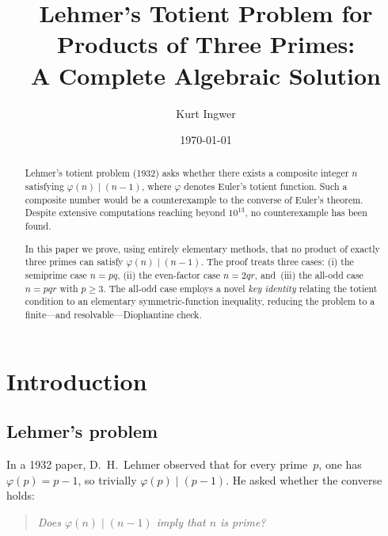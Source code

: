 \documentclass[12pt,a4paper]{amsart}
\theoremstyle{definition}
\newcommand{\euler}{\varphi}
\begin{document}

\title{Lehmer's Totient Problem for Products of Three Primes:\\
       A Complete Algebraic Solution}

\author{Kurt Ingwer}
\address{Specialist Mathematics Project, Version Build 43}
\date{\today}

\begin{abstract}
Lehmer's totient problem (1932) asks whether there exists a composite integer
$n$ satisfying $\euler(n) \mid (n-1)$, where $\euler$ denotes Euler's totient
function.  Such a composite number would be a counterexample to the converse of
Euler's theorem.  Despite extensive computations reaching beyond $10^{13}$,
no counterexample has been found.

In this paper we prove, using entirely elementary methods, that no product of
exactly three primes can satisfy $\euler(n) \mid (n-1)$.  The proof treats
three cases: (i) the semiprime case $n = pq$, (ii) the even-factor case
$n = 2qr$, and~(iii) the all-odd case $n = pqr$ with $p \ge 3$.  The
all-odd case employs a novel \emph{key identity} relating the totient condition
to an elementary symmetric-function inequality, reducing the problem to a
finite—and resolvable—Diophantine check.
\end{abstract}

\maketitle

\section{Introduction}

\subsection{Lehmer's problem}

In a 1932 paper, D.\ H.\ Lehmer \cite{Lehmer1932} observed that for every
prime~$p$, one has $\euler(p) = p - 1$, so trivially $\euler(p) \mid (p-1)$.
He asked whether the converse holds:

\begin{quote}
\emph{Does $\euler(n) \mid (n - 1)$ imply that $n$ is prime?}
\end{quote}
\end{document}
